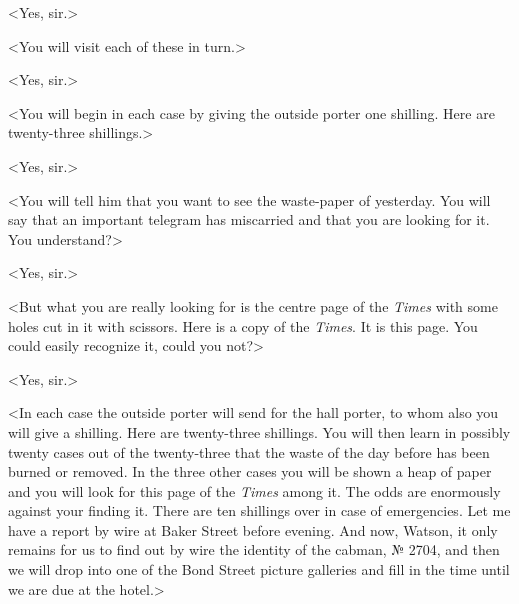 <Yes, sir.>

<You will visit each of these in turn.>

<Yes, sir.>

<You will begin in each case by giving the outside porter one shilling. Here are twenty-three shillings.>

<Yes, sir.>

<You will tell him that you want to see the waste-paper of yesterday. You will say that an important telegram has miscarried and that you are looking for it. You understand?>

<Yes, sir.>

<But what you are really looking for is the centre page of the \textit{Times} with some holes cut in it with scissors. Here is a copy of the \textit{Times}. It is this page. You could easily recognize it, could you not?>

<Yes, sir.>

<In each case the outside porter will send for the hall porter, to whom also you will give a shilling. Here are twenty-three shillings. You will then learn in possibly twenty cases out of the twenty-three that the waste of the day before has been burned or removed. In the three other cases you will be shown a heap of paper and you will look for this page of the \textit{Times} among it. The odds are enormously against your finding it. There are ten shillings over in case of emergencies. Let me have a report by wire at Baker Street before evening. And now, Watson, it only remains for us to find out by wire the identity of the cabman, № 2704, and then we will drop into one of the Bond Street picture galleries and fill in the time until we are due at the hotel.>
